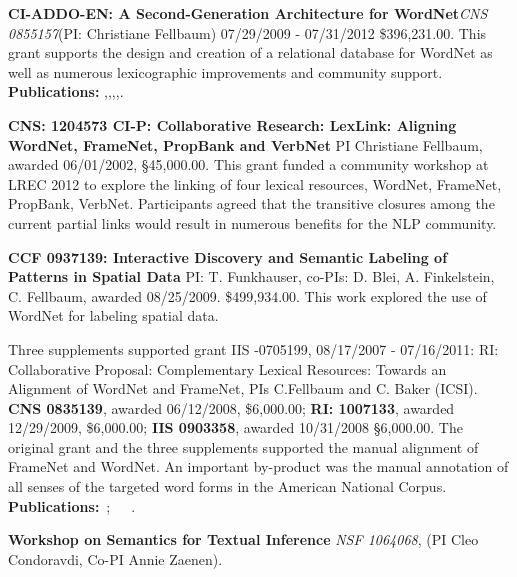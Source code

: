 \documentclass[10pt]{article}
\renewcommand{\thepage} {D--\arabic{page}}
\newcommand{\miniskip}{\vspace*{1mm}}
\begin{document}
\miniskip\noindent
{\bf CI-ADDO-EN: A Second-Generation Architecture for WordNet}{\it CNS 0855157}(PI: Christiane Fellbaum) 07/29/2009 - 07/31/2012
\$396,231.00. This grant supports the design and creation of a relational database for WordNet as well as numerous lexicographic improvements 
and community support. {\bf Publications:} \cite{fellbaumvossen2012},\cite{fellbaumencyclopedia},\cite{fellbaumontology2010},\cite{chiarcosinpress},\cite{nikolova2012}.

\miniskip\noindent
{\bf CNS: 1204573 CI-P: Collaborative Research: LexLink: Aligning WordNet, FrameNet, PropBank and VerbNet} PI Christiane Fellbaum, awarded 06/01/2002, 
\S45,000.00. This grant funded a community workshop at LREC 2012 to explore the linking of four lexical resources, WordNet, FrameNet, PropBank, VerbNet. 
Participants agreed that the transitive closures among the current partial links would result in numerous benefits for the NLP community. 

\miniskip\noindent
{\bf CCF 0937139: Interactive Discovery and Semantic Labeling of Patterns in Spatial Data} PI: T. Funkhauser, co-PIs: D. Blei, A. Finkelstein, C. Fellbaum, awarded 08/25/2009.
\$499,934.00. This work explored the use of WordNet for labeling spatial data. 

\miniskip\noindent
Three supplements supported grant IIS -0705199, 08/17/2007 - 07/16/2011: RI: Collaborative Proposal: Complementary Lexical Resources: 
Towards an Alignment of WordNet and FrameNet, PIs C.Fellbaum and C. Baker (ICSI). 
{\bf CNS 0835139}, awarded 06/12/2008, \$6,000.00; {\bf RI: 1007133}, awarded 12/29/2009, \$6,000.00; {\bf IIS 0903358}, awarded 10/31/2008 \S6,000.00. 
The original grant and the three supplements supported the manual alignment of FrameNet and WordNet. An important by-product was the manual 
annotation of all senses of the targeted word forms in the American National Corpus. {\bf Publications:}~\cite{fellbaumbakerLRE};~\cite{bakerfellbaum2008}~\cite{bakerfellbaum2009}~\cite{demelo2012}.


\miniskip\noindent
{\bf Workshop on Semantics for Textual Inference}
{\it  NSF  1064068}, (PI Cleo Condoravdi, Co-PI Annie Zaenen).

 \nocite{zaenen+karttunen:2013}
\nocite{csli-gang-cssp13}
\nocite{csli-gang-cil13}
\nocite{faust-adj-pol-lex}

\newpage
{}
\renewcommand{\thepage} {E--\arabic{page}}


%

\end{document}
